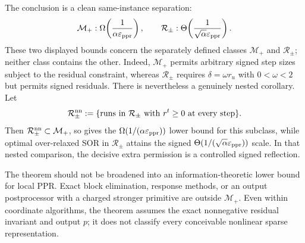 The conclusion is a clean same-instance separation:
\begin{equation}
  \mathcal M_+:
  \Omega\!\left(\frac1{\alpha\varepsilon_{\rm ppr}}\right),
  \qquad
  \mathcal R_\pm:
  \Theta\!\left(\frac1{\sqrt\alpha\varepsilon_{\rm ppr}}\right).
  \label{eq:signed-star-sign-separation}
\end{equation}
These two displayed bounds concern the separately defined classes
$\mathcal M_+$ and $\mathcal R_\pm$; neither class contains the other.
Indeed, $\mathcal M_+$ permits arbitrary signed step sizes subject to the
residual constraint, whereas $\mathcal R_\pm$ requires
$\delta=\omega r_u$ with $0<\omega<2$ but permits signed residuals.
There is nevertheless a genuinely nested corollary.  Let
\begin{equation*}
 \mathcal R_\pm^{\rm nn}
 :=\{\text{runs in $\mathcal R_\pm$ with $r^t\geq0$ at every step}\}.
\end{equation*}
Then $\mathcal R_\pm^{\rm nn}\subset\mathcal M_+$, so
 gives the
$\Omega(1/(\alpha\varepsilon_{\rm ppr}))$ lower bound for this subclass,
while optimal over-relaxed SOR in $\mathcal R_\pm$ attains the signed
$\Theta(1/(\sqrt\alpha\varepsilon_{\rm ppr}))$ scale.  In that nested
comparison, the decisive extra permission is a controlled signed reflection.

The theorem should not be broadened into an information-theoretic lower
bound for local PPR.  Exact block elimination, response methods, or an output
postprocessor with a charged stronger primitive are outside
$\mathcal M_+$.  Even within coordinate algorithms, the theorem assumes the
exact nonnegative residual invariant and output $p$; it does not classify
every conceivable nonlinear sparse representation.
